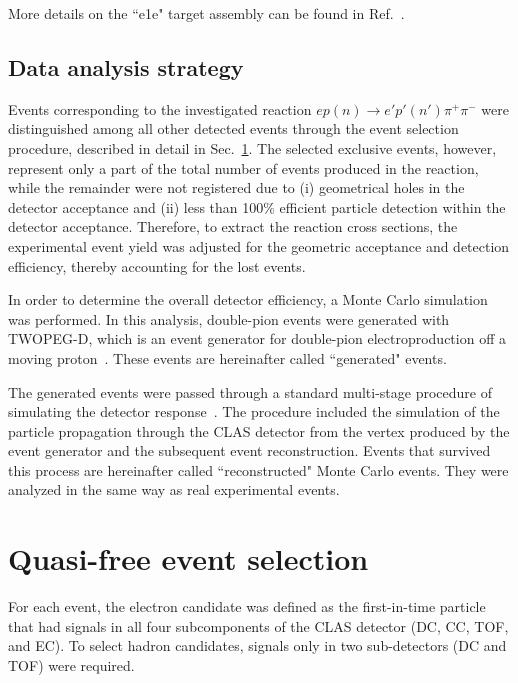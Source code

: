 \documentclass[prc,twocolumn,superscriptaddress,showpacs,amssymb,amsmath,amsfonts,aps,nofootinbib]{revtex4-1}
\begin{document}
More details on the ``e1e" target assembly can be found in Ref.\!~\cite{target}.


\subsection{Data analysis strategy}
\label{Sect:clas_software}

Events corresponding to the investigated reaction $ep(n) \rightarrow e'p'(n')\pi^{+}\pi^{-}$ were distinguished among all other detected events through the event selection procedure, described in detail in Sec.\!~\ref{Sect:select}. The selected exclusive events,  however, represent only a part of the total number of events produced in the reaction, while the remainder were not registered due to (i) geometrical holes in the detector acceptance and (ii) less than 100\% efficient particle detection within the detector acceptance. Therefore, to extract the reaction cross sections, the experimental event yield was adjusted for the geometric acceptance and detection efficiency, thereby accounting for the lost events.

In order to determine the overall detector efficiency, a Monte Carlo simulation was performed. In this analysis, double-pion events were generated with TWOPEG-D, which is an event generator for double-pion electroproduction off a moving proton~\cite{twopeg-d}. These events are hereinafter called ``generated" events. 

The generated events were passed through a standard multi-stage procedure of simulating the detector response~\cite{Mecking:2003zu}. The procedure included the simulation of the particle propagation through the CLAS detector from the vertex produced by the event generator and the subsequent event reconstruction. Events that survived this process are hereinafter called ``reconstructed" Monte Carlo events. They were analyzed in the same way as real experimental events. 





\section{Quasi-free event selection}
\label{Sect:select}

For each event, the electron candidate was defined as the first-in-time particle that had signals in all four subcomponents of the CLAS detector (DC, CC, TOF, and EC). To select hadron candidates, signals only in two sub-detectors (DC and TOF) were required.
\end{document}
